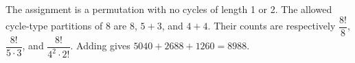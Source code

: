 The assignment is a permutation with no cycles of length 1 or 2. The allowed cycle-type partitions of 8 are $ 8 $, $ 5+3 $, and $ 4+4 $. Their counts are respectively $\dfrac{8!}{8}$, $\dfrac{8!}{5\cdot3}$, and $\dfrac{8!}{4^2\cdot2!}$. Adding gives $ 5040+2688+1260=\boxed{8988}$.
